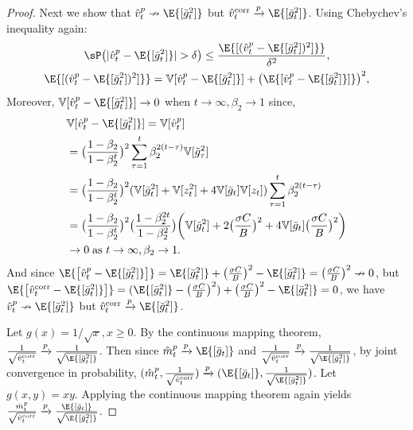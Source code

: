 \documentclass[letterpaper]{article} %
\def\V{\mathbb{V}}
\begin{document}
\begin{proof}
Next we show that $\hat{v}_t^{p} \nrightarrow \E{[\Bar{g}_t^2]}$ but $\hat{v}_t^{\textnormal{corr}} \xrightarrow{p} \E{[\Bar{g}_t^2]}$. Using Chebychev's inequality again:
\begin{equation*}
\begin{gathered}
    \sP\big( |\hat{v}_t^p - \E{[\Bar{g}_t^2]}| > \delta \big) \leq \frac{\E{[(\hat{v}_t^p - \E{[\Bar{g}_t^2])^2]}}}{\delta^2}, \\
    \E{[(\hat{v}_t^p - \E{[\Bar{g}_t^2])^2]}} = \V{[\hat{v}_t^p - \E{[\Bar{g}_t^2]}]} + \big(\E{[\hat{v}_t^p - \E{[\Bar{g}_t^2]}]}\big)^2,
\end{gathered}
\end{equation*}
Moreover, $\V{[\hat{v}_t^p - \E{[\Bar{g}_t^2]}]} \rightarrow 0$ when $t\rightarrow \infty, \beta_2 \rightarrow 1$ since,
\begin{align*}
    &\V{[\hat{v}_t^p - \E{[\Bar{g}_t^2]}]} = \V{[\hat{v}_t^p]} \\
    &= \big( \frac{1-\beta_2}{1-\beta_2^t} \big)^2 \sum_{\tau=1}^{t} \beta_2^{2(t-\tau)} \V{[\Tilde{g}_{\tau}^2]} \\
    &= \big( \frac{1-\beta_2}{1-\beta_2^t} \big)^2 (\V{[\Bar{g}_t^2]} + \V{[z_t^2]} + 4\V{[\Bar{g}_t]}\V{[z_t]}) \sum_{\tau=1}^{t} \beta_2^{2(t-\tau)}  \\
    &= \big( \frac{1-\beta_2}{1-\beta_2^t} \big)^2  \big( \frac{1-\beta_2^{2t}}{1-\beta_2^2} \big) \bigg( \V{[\Bar{g}_t^2]} + 2\big( \frac{\sigma C}{B} \big)^2 + 4\V{[\Bar{g}_t]} \big( \frac{\sigma C}{B} \big)^2\bigg) \\
    &\rightarrow 0 \; \textnormal{as } t\rightarrow \infty, \beta_2 \rightarrow 1.
\end{align*}
And since $\E{\big[ \hat{v}_t^{p} - \E{[\Bar{g}_t^2]} \big]} = \E{[\Bar{g}_t^2]} + \big(\frac{\sigma C}{B} \big)^2 - \E{[\Bar{g}_t^2]} = \big(\frac{\sigma C}{B} \big)^2 \nrightarrow 0$, but $\E{\big[ \hat{v}_t^{\textnormal{corr}} - \E{[\Bar{g}_t^2]} \big]} = (\E{[\Bar{g}_t^2]} - \big(\frac{\sigma C}{B} \big)^2) + \big(\frac{\sigma C}{B} \big)^2 - \E{[\Bar{g}_t^2]} = 0$, we have $\hat{v}_t^{p} \nrightarrow \E{[\Bar{g}_t^2]}$ but $\hat{v}_t^{\textnormal{corr}} \xrightarrow{p} \E{[\Bar{g}_t^2]}$.

Let $g(x)=1/\sqrt{x}, x\geq 0$. By the continuous mapping theorem, $\frac{1}{\sqrt{\hat{v}_t^{\textnormal{corr}}}} \xrightarrow{p} \frac{1}{\sqrt{\E{[\Bar{g}_t^2]}}}$. Then since $\hat{m}_t^{p} \xrightarrow{p} \E{[\Bar{g}_t]}$ and $\frac{1}{\sqrt{\hat{v}_t^{\textnormal{corr}}}} \xrightarrow{p} \frac{1}{\sqrt{\E{[\Bar{g}_t^2]}}}$, by joint convergence in probability, $(\hat{m}_t^{p}, \frac{1}{\sqrt{\hat{v}_t^{\textnormal{corr}}}}) \xrightarrow{p} (\E{[\Bar{g}_t]}, \frac{1}{\sqrt{\E{[\Bar{g}_t^2]}}})$.
Let $g(x,y)=xy$. Applying the continuous mapping theorem again yields $\frac{\hat{m}_t^p}{\sqrt{\hat{v}_t^{\textnormal{corr}}}} \xrightarrow{p} \frac{\E{[\Bar{g}_t]}}{\sqrt{\E{[\Bar{g}_t^2]}}}$.
\end{proof}
\end{document}
